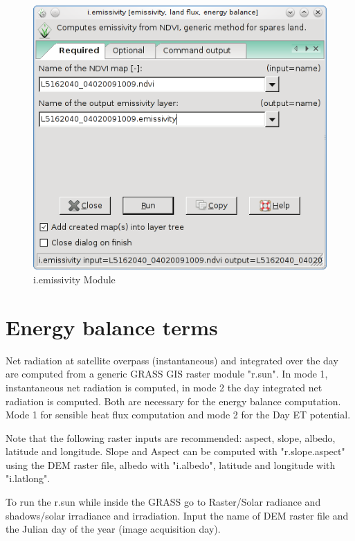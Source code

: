 \begin{figure}[htbp]
   \centering
   \includegraphics[scale=0.4]{gipe021.png}
   \caption{i.emissivity Module}
   \label{fig:gipe021}
\end{figure}


\section{Energy balance terms}

Net radiation at satellite overpass (instantaneous) and integrated over the day are computed from a generic GRASS GIS raster module "r.sun". In mode 1, instantaneous net radiation is computed, in mode 2 the day integrated net radiation is computed. Both are necessary for the energy balance computation. Mode 1 for sensible heat flux computation and mode 2 for the Day ET potential.\newline

Note that the following raster inputs are recommended: aspect, slope, albedo, latitude and longitude.
Slope and Aspect can be computed with "r.slope.aspect" using the DEM raster file, albedo with "i.albedo", latitude and longitude with "i.latlong".\newline

To run the r.sun while inside the GRASS go to Raster/Solar radiance and shadows/solar irradiance and irradiation. Input the name of DEM raster file and the Julian day of the year (image acquisition day).\newline


